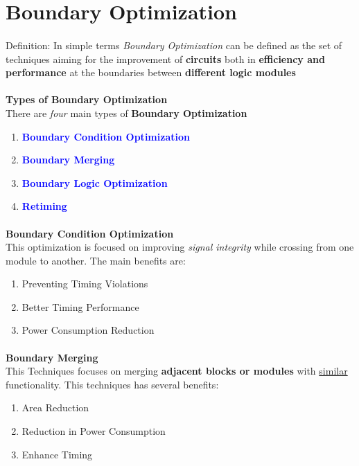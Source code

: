 \section{Boundary Optimization}
\paragraph{}
Definition: In simple terms \emph{Boundary Optimization} can be defined as the set of techniques
aiming for the improvement of \textbf{circuits} both in \textbf{efficiency and performance} at the boundaries between \textbf{different logic modules}
	
\paragraph{}
\textbf{Types of Boundary Optimization} \\
There are \emph{four} main types of \textbf{Boundary Optimization} 
\begin{enumerate}[label=\textcolor{blue}{\arabic*.}]
\item \textcolor{blue}{\textbf{Boundary Condition Optimization}} 
\item \textcolor{blue}{\textbf{Boundary Merging}}
\item \textcolor{blue}{\textbf{Boundary Logic Optimization}}
\item \textcolor{blue}{\textbf{Retiming}}
\end{enumerate}
\paragraph{}
\textbf{Boundary Condition Optimization} \\
This optimization is focused on improving \emph{signal integrity} while crossing from one module to another. The main benefits are:
\begin{enumerate}
\item Preventing Timing Violations
\item Better Timing Performance 
\item Power Consumption Reduction 
\end{enumerate}
\paragraph{}
\textbf{Boundary Merging} \\
This Techniques focuses on merging \textbf{adjacent blocks or modules} with \underline{similar} functionality. This techniques has several benefits:
\begin{enumerate}
\item Area Reduction
\item Reduction in Power Consumption
\item Enhance Timing
\end{enumerate}
